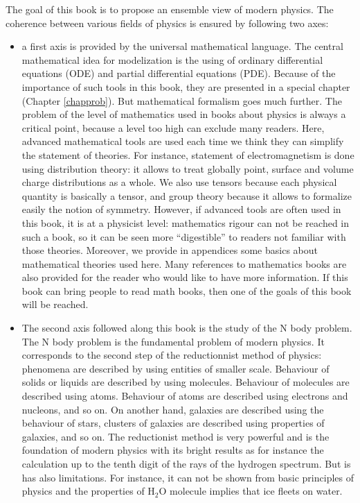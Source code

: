 \documentclass[12pt]{book}
\begin{document}
The goal of this book is to propose an ensemble view of modern physics. The
coherence between various fields of physics is ensured by following two axes:
\begin{itemize}
\item a first axis is provided by the universal mathematical language. The
  central mathematical idea for modelization is the using of ordinary
  differential equations (ODE) and partial differential equations
  (PDE). Because of the importance of such tools in this book, they are
  presented in a special chapter (Chapter \ref{chapprob}). But mathematical
  formalism goes much further. The problem of the 
  level of mathematics used in books about physics is always a critical point,
  because a level too high can exclude many readers. Here, 
advanced mathematical tools are used each time we think they can simplify the 
statement of theories. For instance, statement of electromagnetism is done
using distribution theory: it allows to treat globally point, surface and
volume charge distributions as a whole. We also use tensors because each
physical quantity is basically a tensor, and group theory because it allows to
formalize easily the notion of symmetry. 
However, if advanced tools are often
used in this book, it is at a physicist level: mathematics rigour can not be
reached in such a book, so it can be seen  more ``digestible'' to readers
not familiar with those theories. Moreover, we provide in appendices some
basics about mathematical theories used here. Many references to mathematics
books are also provided for the reader who would like to have more
information. If this book can bring people to read math books, then one of the
goals of this book will be reached.
\item The second axis followed along this book is the study of the N body
  problem. The N 
body problem is the fundamental problem of modern physics. It corresponds to
the second step of the reductionnist method of physics: phenomena are
  described by using entities of 
smaller scale. Behaviour of solids or liquids are described by using
molecules. Behaviour of molecules are described using atoms. Behaviour of
atoms are described using electrons and nucleons, and so on. On another hand,
galaxies are described using the behaviour of stars, clusters of galaxies are
described using properties of galaxies, and so on.
The reductionist method is very powerful and is the foundation of modern
physics with its bright results as for instance the calculation up to the
tenth digit of the rays of the hydrogen spectrum. But is has also limitations.
For instance, it can not be shown from basic principles of physics and the
properties of H$_2$O molecule implies that ice fleets on water.
\end{itemize}
\end{document}
